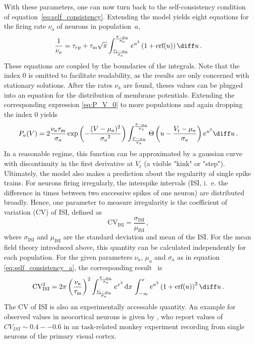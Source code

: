 With these parameters, one can now turn back to the self-consistency condition 
of equation~\eqref{eq:self_consistency}. Extending the model yields eight equations for the 
firing rate $\nu_a$ of neurons in population~$a$, 
\begin{equation}
    \frac{1}{\nu_{a}} = \tau_{rp} 
        + \tau_\text{m} \sqrt{\pi}
            \int_{\frac{V_\text{r} - \mu_{a}}{\sigma_{a}}}^{\frac{\theta - \mu_{a}}{\sigma_{a}}} 
                e^{u^2} \left(1 + \text{erf}(u)\right) \diff u  \,.
    \label{eq:self_consistency_a}
\end{equation}
These equations are coupled by the boundaries of the integrals. Note that the index $0$ 
is omitted to facilitate readability, as the results are only concerned with stationary
solutions. After the rates $\nu_a$ are found, theses values can be 
plugged into an equation for the distribution of membrane potentials. Extending the 
corresponding expression \eqref{eq:P_V_0} to more populations and again dropping the 
index $0$ yields
\begin{equation}
    P_a(V) = 2 \frac{\nu_a \tau_\text{m}}{\sigma_a} 
        \exp{\left(- \frac{(V - \mu_a)^2}{{\sigma_a}^2} \right)}
        \int_{\frac{V - \mu_a}{\sigma_a}}^{\frac{\theta - \mu_a}{\sigma_a}} \! 
            \Theta \left(u - \frac{V_\text{r} - \mu_a}{\sigma_a} \right) e^{u^2} \diff u  \,.
    \label{eq:P_V_a}
\end{equation}
In a reasonable regime, this function can be approximated by a gaussian curve with discontinuity in the first 
derivative at $V_\text{r}$ (a visible "kink" or "step").
Ultimately, the model also makes a prediction about the regularity of single spike 
trains. For neurons firing irregularly, the interspike intervals
(ISI, i.~e. the difference in times between two successive spikes of one neuron) 
are distributed broadly. Hence, one parameter to measure irregularity is the coefficient 
of variation (CV) of ISI, defined as
\begin{equation}
    \text{CV}_\text{ISI} = \frac{\sigma_\text{ISI}}{\mu_\text{ISI}} \,,
    \label{eq:cv_isi}
\end{equation}
where $\sigma_\text{ISI}$ and $\mu_\text{ISI}$ are the standard deviation and mean of 
the ISI. For the mean field theory introduced above, this quantity can be calculated
independently for each population. For the given parameters $\nu_a$, $\mu_a$ and 
$\sigma_a$ as in equation \eqref{eq:self_consistency_a}, the corresponding 
result~\cite{brunel2000} is
\begin{equation}
    \text{CV}_\text{ISI}^2 
        = 2 \pi \left(\frac{\nu_a}{\tau_\text{m}}\right)^2
            \int_{\frac{V_\text{r} - \mu_{a}}{\sigma_{a}}}^{\frac{\theta - \mu_{a}}{\sigma_{a}}} 
            e^{x^2}  \,\text{d}x  \,
            \int_{-\infty}^{x} 
            e^{u^2} \left(1 + \text{erf}(u)\right)^2 \diff u  \,.
    \label{eq:CV_ISI_mf}
\end{equation}
The CV of ISI is also an experimentally accessable quantity. An example for observed 
values in neocortical neurons is given by , who report values
of $CV_{ISI} \sim 0.4 -- 0.6$ in an task-related monkey experiment recording from 
single neurons of the primary visual cortex.

